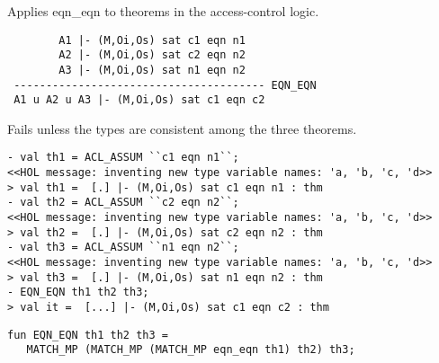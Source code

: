 

\egroup

\SYNOPSIS
Applies eqn\_eqn to theorems in the access-control logic.

\DESCRIBE
\begin{verbatim}
        A1 |- (M,Oi,Os) sat c1 eqn n1
        A2 |- (M,Oi,Os) sat c2 eqn n2  
        A3 |- (M,Oi,Os) sat n1 eqn n2
 --------------------------------------- EQN_EQN
 A1 u A2 u A3 |- (M,Oi,Os) sat c1 eqn c2
\end{verbatim}

\FAILURE Fails unless the types are consistent among the three
theorems.

\EXAMPLE
\begin{holboxed}
\begin{verbatim}
- val th1 = ACL_ASSUM ``c1 eqn n1``;
<<HOL message: inventing new type variable names: 'a, 'b, 'c, 'd>>
> val th1 =  [.] |- (M,Oi,Os) sat c1 eqn n1 : thm
- val th2 = ACL_ASSUM ``c2 eqn n2``;
<<HOL message: inventing new type variable names: 'a, 'b, 'c, 'd>>
> val th2 =  [.] |- (M,Oi,Os) sat c2 eqn n2 : thm
- val th3 = ACL_ASSUM ``n1 eqn n2``;
<<HOL message: inventing new type variable names: 'a, 'b, 'c, 'd>>
> val th3 =  [.] |- (M,Oi,Os) sat n1 eqn n2 : thm
- EQN_EQN th1 th2 th3;
> val it =  [...] |- (M,Oi,Os) sat c1 eqn c2 : thm
\end{verbatim}
\end{holboxed}

\IMPLEMENTATION
\begin{holboxed}
\begin{verbatim}
fun EQN_EQN th1 th2 th3 =
   MATCH_MP (MATCH_MP (MATCH_MP eqn_eqn th1) th2) th3;
\end{verbatim}
\end{holboxed}

